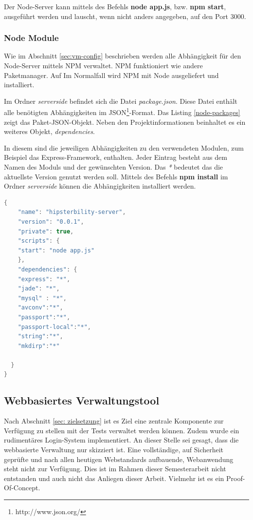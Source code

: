 Der Node-Server kann mittels des Befehls \textbf{node app.js}, bzw. \textbf{npm start}, ausgeführt werden und lauscht, wenn nicht anders angegeben, auf den Port 3000. 

\subsubsection{Node Module \label{sec:node-mudules}}

Wie im Abschnitt \ref{sec:vm-config} beschrieben werden alle Abhängigkeit für den Node-Server mittels NPM verwaltet. NPM funktioniert wie andere Paketmanager. Auf Im Normalfall wird NPM mit Node ausgeliefert und installiert. 

Im Ordner \textit{serverside} befindet sich die Datei \emph{package.json}. Diese Datei enthält alle benötigten Abhängigkeiten im \ac{JSON}\footnote{http://www.json.org/}-Format. Das Listing \ref{node-packages} zeigt das Paket-JSON-Objekt. Neben den Projektinformationen beinhaltet es ein weiteres Objekt, \emph{dependencies}. 

In diesem sind die jeweiligen Abhängigkeiten zu den verwendeten Modulen, zum Beispiel das Express-Framework, enthalten. Jeder Eintrag besteht aus dem Namen des Moduls und der gewünschten Version. Das \emph{*} bedeutet das die aktuellste Version genutzt werden soll. Mittels des Befehls \textbf{npm install} im Ordner \textit{serverside} können die Abhängigkeiten installiert werden. 

\begin{lstlisting}[label=node-packages,language=Java, caption=Abhängigkeiten der Node-Anwendung]
{
    "name": "hipsterbility-server",
    "version": "0.0.1",
    "private": true,
    "scripts": {
    "start": "node app.js"
    },
    "dependencies": {
    "express": "*",
	"jade": "*",
	"mysql" : "*",
    "avconv":"*",
    "passport":"*",
    "passport-local":"*",
    "string":"*",
    "mkdirp":"*"

  }
}
\end{lstlisting}

\subsection{Webbasiertes Verwaltungstool\label{sec:web_verwaltung}}

Nach Abschnitt \ref{sec: zielsetzung} ist es Ziel eine zentrale Komponente zur Verfügung zu stellen mit der Tests verwaltet werden können. Zudem wurde ein rudimentäres Login-System implementiert. An dieser Stelle sei gesagt, dass die webbasierte Verwaltung nur skizziert ist. Eine vollständige, auf Sicherheit geprüfte und nach allen heutigen Webstandards aufbauende, Webanwendung steht nicht zur Verfügung. Dies ist im Rahmen dieser Semesterarbeit nicht entstanden und auch nicht das Anliegen dieser Arbeit. Vielmehr ist es ein Proof-Of-Concept. 

